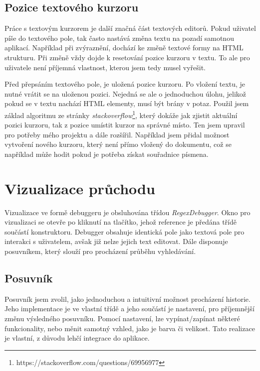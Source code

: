 \subsection*{Pozice textového kurzoru}
Práce s textovým kurzorem je další značná část textových editorů.
Pokud uživatel píše do textového pole, tak často nastává změna textu na pozadí samotnou aplikací.
Například při zvýraznění, dochází ke změně textové formy na HTML strukturu.
Při změně vždy dojde k resetování pozice kurzoru v textu.
To ale pro uživatele není příjemná vlastnost, kterou jsem tedy musel vyřešit.

Před přepsáním textového pole, je uložená pozice kurzoru.
Po vložení textu, je nutné vrátit se na uloženou pozici. 
Nejedná se ale o jednoduchou úlohu, jelikož pokud se v textu nachází HTML elementy, musí být brány v potaz.
Použil jsem základ algoritmu ze stránky \textit{stackoverflow}\footnote{https://stackoverflow.com/questions/69956977}, který dokáže jak zjistit aktuální pozici kurzoru, tak z pozice umístit kurzor na správné místo.
Ten jsem upravil pro potřeby mého projektu a dále rozšířil.
Například jsem přidal možnost vytvoření nového kurzoru, který není přímo vložený do dokumentu, což se například může hodit pokud je potřeba získat souřadnice písmena.

\section{Vizualizace průchodu}

Vizualizace ve formě debuggeru je obsluhována třídou \textit{RegexDebugger}.
Okno pro vizualizaci se otevře po kliknutí na tlačítko, jehož reference je předána třídě součástí konstruktoru.
Debugger obsahuje identická pole jako textová pole pro interakci s uživatelem, avšak již nelze jejich text editovat.
Dále disponuje posuvníkem, který slouží pro procházení průběhu vyhledávání. 

\subsection*{Posuvník}

Posuvník jsem zvolil, jako jednoduchou a intuitivní možnost procházení historie.
Jeho implementace je ve vlastní třídě a jeho součástí je nastavení, pro příjemnější změnu výsledného posuvníku.
Pomocí nastavení, lze vypínat/zapínat některé funkcionality, nebo měnit samotný vzhled, jako je barva či velikost.
Tato realizace je vlastní, z důvodu lehčí integrace do aplikace.

